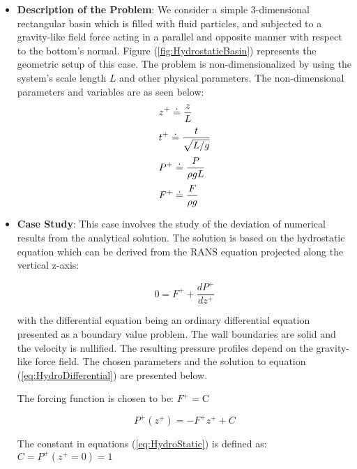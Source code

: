 \documentclass{../GPUSPHtemplate}
\begin{document}
\begin{itemize}
\item \textbf{Description of the Problem}: We consider a simple 3-dimensional rectangular basin which is
  filled with fluid particles, and subjected to a gravity-like field force acting in a parallel and
  opposite manner with respect to the bottom's normal. Figure (\ref{fig:HydrostaticBasin}) represents the
  geometric setup of this case. The problem is non-dimensionalized by using the system's scale length $L$
  and other physical parameters. The non-dimensional parameters and variables are as seen below:   
  \begin{equation}
    \begin{array}{l}
      \displaystyle{  z^{+} \doteq \frac{z}{L} } \medskip \\ 
      \displaystyle{  t^{+} \doteq \frac{t}{\sqrt{L/g}} } \medskip \\ 
      \displaystyle{  P^{+} \doteq \frac{P}{\rho gL} } \medskip \\ 
      \displaystyle{  F^{+} \doteq \frac{F}{\rho g} } 
    \end{array}
  \end{equation}  
  
\item \textbf{Case Study}:  This case involves the study of the deviation of numerical results
  from the analytical solution. The solution is based on the hydrostatic equation which can be
  derived from the RANS equation projected along the vertical z-axis: 
  
  \begin{equation}\label{eq:HydroDifferential}
    0 = F^{+}+ \frac{d P^+}{d z^+}
  \end{equation}
  
  with the differential equation being an ordinary differential equation presented as a boundary value problem.
  The wall boundaries are solid and the velocity is nullified. The resulting pressure profiles
  depend on the gravity-like force field. The chosen parameters and
  the solution to equation (\ref{eq:HydroDifferential}) are presented below.
  
  The forcing function is chosen to be: $ F^+ = \text{C}  $  
    
  \begin{equation}\label{eq:HydroStatic}
    P^+(z^+) =  -F^{+} z^+  + C
  \end{equation}
  
  The constant in equations (\ref{eq:HydroStatic}) is defined as:\\
  $C = P^+(z^+ = 0) = 1$
  

\end{itemize}
\end{document}
